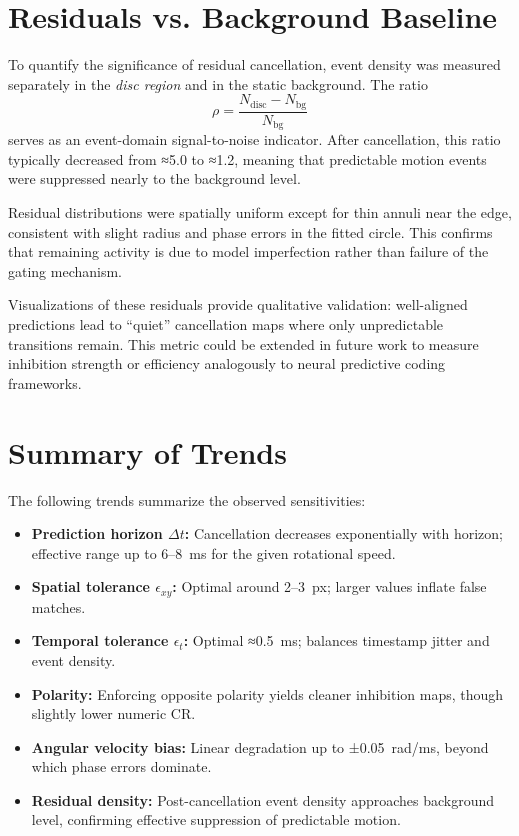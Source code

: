 \section{Residuals vs. Background Baseline}
\label{sec:residuals_baseline}

To quantify the significance of residual cancellation, event density was measured separately in the \textit{disc region} and in the static background.
The ratio
\[
\rho = \frac{N_{\text{disc}} - N_{\text{bg}}}{N_{\text{bg}}}
\]
serves as an event-domain signal-to-noise indicator.
After cancellation, this ratio typically decreased from ≈5.0 to ≈1.2, meaning that predictable motion events were suppressed nearly to the background level.

Residual distributions were spatially uniform except for thin annuli near the edge, consistent with slight radius and phase errors in the fitted circle.
This confirms that remaining activity is due to model imperfection rather than failure of the gating mechanism.

Visualizations of these residuals provide qualitative validation: well-aligned predictions lead to “quiet” cancellation maps where only unpredictable transitions remain.
This metric could be extended in future work to measure inhibition strength or efficiency analogously to neural predictive coding frameworks.

\section{Summary of Trends}
\label{sec:summary_trends}

The following trends summarize the observed sensitivities:

\begin{itemize}
    \item \textbf{Prediction horizon \(\Delta t\):} Cancellation decreases exponentially with horizon; effective range up to 6–8~ms for the given rotational speed.
    \item \textbf{Spatial tolerance \(\epsilon_{xy}\):} Optimal around 2–3~px; larger values inflate false matches.
    \item \textbf{Temporal tolerance \(\epsilon_t\):} Optimal ≈0.5~ms; balances timestamp jitter and event density.
    \item \textbf{Polarity:} Enforcing opposite polarity yields cleaner inhibition maps, though slightly lower numeric CR.
    \item \textbf{Angular velocity bias:} Linear degradation up to ±0.05~rad/ms, beyond which phase errors dominate.
    \item \textbf{Residual density:} Post-cancellation event density approaches background level, confirming effective suppression of predictable motion.
\end{itemize}

